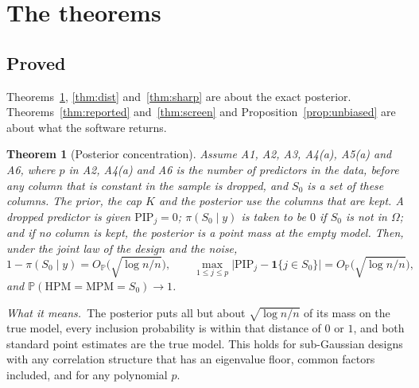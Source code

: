 \documentclass[11pt]{article}
\renewcommand{\P}{\mathbb{P}}
\newcommand{\ind}[1]{\mathbf{1}\{#1\}}
\newcommand{\Sz}{S_0}
\newcommand{\Om}{\Omega}
\newcommand{\pis}[1]{\pi(#1\mid y)}
\newcommand{\PIP}{\mathrm{PIP}}
\newcommand{\HPM}{\mathrm{HPM}}
\newcommand{\MPM}{\mathrm{MPM}}
\newcommand{\rn}{\sqrt{\log n/n}}
\newcommand{\OP}{O_{\P}}
\theoremstyle{plain}
\newtheorem{thm}{Theorem}
\theoremstyle{definition}
\newcommand{\means}{\par\smallskip\noindent\textit{What it means.}\ }
\begin{document}
\section{The theorems}

\subsection{Proved}

Theorems~\ref{thm:post}, \ref{thm:dist} and~\ref{thm:sharp} are about the exact posterior.
Theorems~\ref{thm:reported} and~\ref{thm:screen} and Proposition~\ref{prop:unbiased} are about what the software
returns.

\begin{thm}[Posterior concentration]\label{thm:post}
Assume A1, A2, A3, A4(a), A5(a) and A6, where $p$ in A2, A4(a) and A6 is the number of predictors in the data,
before any column that is constant in the sample is dropped, and $\Sz$ is a set of these columns. The prior, the cap
$K$ and the posterior use the columns that are kept. A dropped predictor is given $\PIP_j=0$; $\pis{\Sz}$ is taken to be
$0$ if $\Sz$ is not in $\Om$; and if no column is kept, the posterior is a point mass at the empty model. Then, under
the joint law of the design and the noise,
\[
  1-\pis{\Sz}=\OP\big(\rn\big),\qquad
  \max_{1\le j\le p}\big|\PIP_j-\ind{j\in\Sz}\big|=\OP\big(\rn\big),
\]
and $\P(\HPM=\MPM=\Sz)\to1$.
\end{thm}
\means The posterior puts all but about $\rn$ of its mass on the true model, every inclusion probability is within that
distance of $0$ or $1$, and both standard point estimates are the true model. This holds for sub-Gaussian designs with
any correlation structure that has an eigenvalue floor, common factors included, and for any polynomial $p$.
\end{document}
